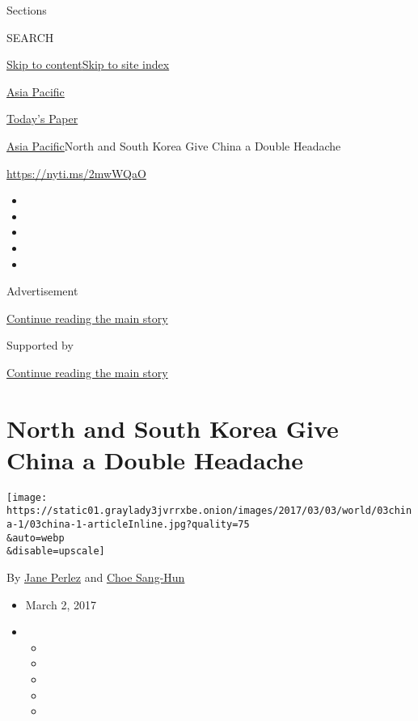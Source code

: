 Sections

SEARCH

\protect\hyperlink{site-content}{Skip to
content}\protect\hyperlink{site-index}{Skip to site index}

\href{https://www.nytimes3xbfgragh.onion/section/world/asia}{Asia
Pacific}

\href{https://myaccount.nytimes3xbfgragh.onion/auth/login?response_type=cookie\&client_id=vi}{}

\href{https://www.nytimes3xbfgragh.onion/section/todayspaper}{Today's
Paper}

\href{/section/world/asia}{Asia Pacific}\textbar{}North and South Korea
Give China a Double Headache

\url{https://nyti.ms/2mwWQaO}

\begin{itemize}
\item
\item
\item
\item
\item
\end{itemize}

Advertisement

\protect\hyperlink{after-top}{Continue reading the main story}

Supported by

\protect\hyperlink{after-sponsor}{Continue reading the main story}

\hypertarget{north-and-south-korea-give-china-a-double-headache}{%
\section{North and South Korea Give China a Double
Headache}\label{north-and-south-korea-give-china-a-double-headache}}

\texttt{[image: https://static01.graylady3jvrrxbe.onion/images/2017/03/03/world/03china-1/03china-1-articleInline.jpg?quality=75\\\&auto=webp\\\&disable=upscale]}

By \href{http://www.nytimes3xbfgragh.onion/by/jane-perlez}{Jane Perlez}
and \href{http://www.nytimes3xbfgragh.onion/by/choe-sang-hun}{Choe
Sang-Hun}

\begin{itemize}
\item
  March 2, 2017
\item
  \begin{itemize}
  \item
  \item
  \item
  \item
  \item
  \end{itemize}
\end{itemize}

